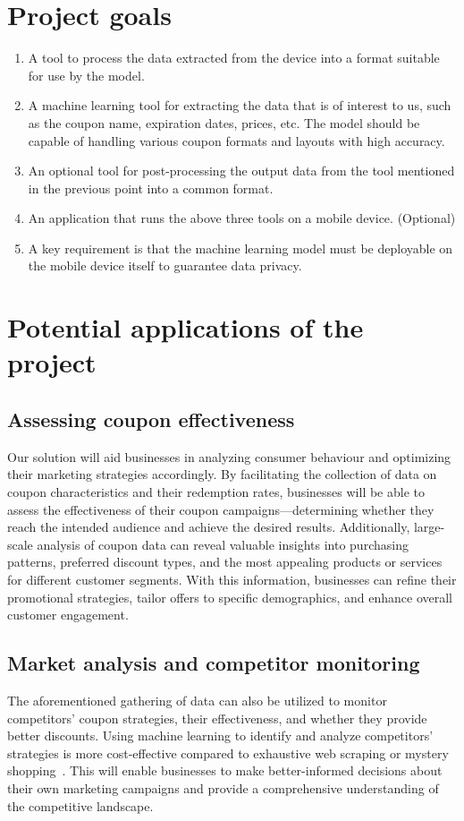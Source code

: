 \documentclass[licencjacka,en]{pracamgr}
\begin{document}
\section{Project goals}
\begin{enumerate}
    \item A tool to process the data extracted from the device into a format suitable for use by the model.
    \item A machine learning tool for extracting the data that is of interest to us, such as the coupon name, expiration dates, prices, etc. The model should be capable of handling various coupon formats and layouts with high accuracy.
    \item An optional tool for post-processing the output data from the tool mentioned in the previous point into a common format.
    \item An application that runs the above three tools on a mobile device. (Optional)
    \item A key requirement is that the machine learning model must be deployable on the mobile device itself to guarantee data privacy.
\end{enumerate} 


\section{Potential applications of the project}
\subsection{Assessing coupon effectiveness}
Our solution will aid businesses in analyzing consumer behaviour and optimizing their marketing strategies accordingly. By facilitating the collection of data on coupon characteristics and their redemption rates, businesses will be able to assess the effectiveness of their coupon campaigns—determining whether they reach the intended audience and achieve the desired results. Additionally, large-scale analysis of coupon data can reveal valuable insights into purchasing patterns, preferred discount types, and the most appealing products or services for different customer segments. With this information, businesses can refine their promotional strategies, tailor offers to specific demographics, and enhance overall customer engagement.

\subsection{Market analysis and competitor monitoring}
The aforementioned gathering of data can also be utilized to monitor competitors' coupon strategies, their effectiveness, and whether they provide better discounts. Using machine learning to identify and analyze competitors' strategies is more cost-effective compared to exhaustive web scraping or mystery shopping~\cite{competitor_tariffs}. This will enable businesses to make better-informed decisions about their own marketing campaigns and provide a comprehensive understanding of the competitive landscape.
\end{document}
